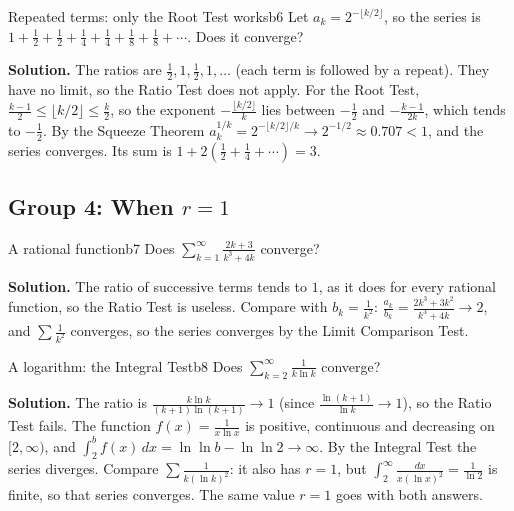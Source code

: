 \documentclass[11pt]{article}
\begin{document}
\begin{exmp}{Repeated terms: only the Root Test works}{b6}
Let $a_k=2^{-\lfloor k/2\rfloor}$, so the series is $1+\frac12+\frac12+\frac14+\frac14+\frac18+\frac18+\cdots$. Does it converge?

\textbf{Solution.} The ratios are $\frac12,1,\frac12,1,\dots$ (each term is followed by a repeat). They have no limit, so the Ratio Test does not apply. For the Root Test, $\frac{k-1}2\le\lfloor k/2\rfloor\le\frac k2$, so the exponent $-\frac{\lfloor k/2\rfloor}k$ lies between $-\frac12$ and $-\frac{k-1}{2k}$, which tends to $-\frac12$. By the Squeeze Theorem $a_k^{1/k}=2^{-\lfloor k/2\rfloor/k}\to2^{-1/2}\approx0.707<1$, and the series converges. Its sum is $1+2\left(\frac12+\frac14+\cdots\right)=3$.
\end{exmp}

\subsection*{Group 4: When $r=1$}

\begin{exmp}{A rational function}{b7}
Does $\displaystyle\sum_{k=1}^\infty\frac{2k+3}{k^3+4k}$ converge?

\textbf{Solution.} The ratio of successive terms tends to $1$, as it does for every rational function, so the Ratio Test is useless. Compare with $b_k=\frac1{k^2}$: $\frac{a_k}{b_k}=\frac{2k^3+3k^2}{k^3+4k}\to2$, and $\sum\frac1{k^2}$ converges, so the series converges by the Limit Comparison Test.
\end{exmp}

\begin{exmp}{A logarithm: the Integral Test}{b8}
Does $\displaystyle\sum_{k=2}^\infty\frac1{k\ln k}$ converge?

\textbf{Solution.} The ratio is $\frac{k\ln k}{(k+1)\ln(k+1)}\to1$ (since $\frac{\ln(k+1)}{\ln k}\to1$), so the Ratio Test fails. The function $f(x)=\frac1{x\ln x}$ is positive, continuous and decreasing on $[2,\infty)$, and $\int_2^bf(x)\,dx=\ln\ln b-\ln\ln2\to\infty$. By the Integral Test the series diverges. Compare $\sum\frac1{k(\ln k)^2}$: it also has $r=1$, but $\int_2^\infty\frac{dx}{x(\ln x)^2}=\frac1{\ln2}$ is finite, so that series converges. The same value $r=1$ goes with both answers.
\end{exmp}
\end{document}
